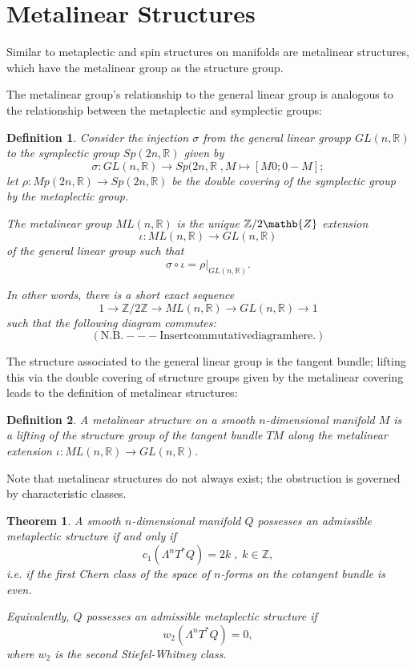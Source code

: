 \documentclass{tufte-handout}
\newtheorem{thrm}{Theorem} %
\newtheorem{defn}{Definition} %
\begin{document}
\section{Metalinear Structures}
Similar to metaplectic and spin structures on manifolds are metalinear structures, which have the metalinear group as the structure group.

The metalinear group's relationship to the general linear group is analogous to the relationship between the metaplectic and symplectic groups:
\begin{fullwidth}
\begin{defn}
Consider the injection $\sigma$ from the general linear groupp $GL(n,\mathbb{R})$ to the symplectic group $Sp(2n,\mathbb{R})$ given by
$$ %
\sigma: GL(n,\mathbb{R}) \to Sp(2n,\mathbb{R} \;, M \mapsto [M 0 ; 0 -M];
$$
let $\rho: Mp(2n, \mathbb{R}) \to Sp(2n, \mathbb{R})$ be the double covering of the symplectic group by the metaplectic group.

The \emph{metalinear group} $ML(n,\mathbb{R})$ is the unique $\mathbb{Z}/2\mathb{Z}$ extension
$$
\iota : ML(n,\mathbb{R}) \to GL(n,\mathbb{R})
$$
of the general linear group such that
$$
\sigma \circ \iota = \rho|_{GL(n,\mathbb{R})}.
$$

In other words, there is a short exact sequence
$$
1 \to \mathbb{Z}/2\mathbb{Z} \to ML(n,\mathbb{R}) \to GL(n,\mathbb{R}) \to 1
$$
such that the following diagram commutes:
$$
\mathrm{(N.B. --- Insert commutative diagram here.)}
$$
\end{defn}
\end{fullwidth}

The structure associated to the general linear group is the tangent bundle; lifting this via the double covering of structure groups given by the metalinear covering leads to the definition of metalinear structures:
\begin{fullwidth}
\begin{defn}
A \emph{metalinear structure} on a smooth $n$-dimensional manifold $M$ is a lifting of the structure group of the tangent bundle $TM$ along the metalinear extension $\iota: ML(n,\mathbb{R}) \to GL(n,\mathbb{R})$.
\end{defn}
\end{fullwidth}

Note that metalinear structures do not always exist; the obstruction is governed by characteristic classes.
\begin{fullwidth}
\begin{thrm}
A smooth $n$-dimensional manifold $Q$ possesses an admissible metaplectic structure if and only if
$$
c_1(\Lambda^n T^* Q) = 2k \;,\; k \in \mathbb{Z},
$$
i.e. if the first Chern class of the space of $n$-forms on the cotangent bundle is even.

Equivalently, $Q$ possesses an admissible metaplectic structure if
$$
w_2(\Lambda^n T^* Q) = 0,
$$
where $w_2$ is the second Stiefel-Whitney class.
\end{thrm}
\end{fullwidth}
\end{document}
